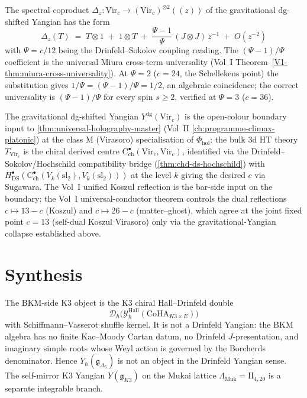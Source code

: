 \begin{remark}
\label{rem:thqg-gravitational-yangian-miura-coproduct}
The spectral coproduct
$\Delta_z\colon \mathrm{Vir}_c \to (\mathrm{Vir}_c)^{\otimes 2}((z))$
of the gravitational dg-shifted Yangian has the form
\[
\Delta_z(T) \;=\; T\otimes 1 \;+\; 1\otimes T \;+\;
\frac{\Psi-1}{\Psi}\,(J\otimes J)\,z^{-1} \;+\; O(z^{-2})
\]
with $\Psi = c/12$ being the Drinfeld--Sokolov coupling reading.
The $(\Psi-1)/\Psi$ coefficient is the universal Miura
cross-term universality (Vol~I
Theorem~\ref*{V1-thm:miura-cross-universality}). At
$\Psi=2$ ($c=24$, the Schellekens point) the substitution gives
$1/\Psi = (\Psi-1)/\Psi = 1/2$, an algebraic coincidence; the
correct universality is $(\Psi-1)/\Psi$ for every spin $s\ge 2$,
verified at $\Psi=3$ ($c=36$).
\end{remark}

\begin{remark}
\label{rem:thqg-gravitational-yangian-uhm}
The gravitational dg-shifted Yangian
$Y^{\mathrm{dg}}(\mathrm{Vir}_c)$ is the open-colour boundary
input to \cref{thm:universal-holography-master} (Vol~II
\cref{ch:programme-climax-platonic}) at the class M (Virasoro)
specialisation of $\Phi_{\mathrm{hol}}$: the bulk 3d HT theory
$T_{\mathrm{Vir}_c}$ is the chiral derived centre
$\mathrm{C}^\bullet_{\mathrm{ch}}(\mathrm{Vir}_c, \mathrm{Vir}_c)$,
identified via the Drinfeld--Sokolov/Hochschild compatibility bridge
(\cref{thm:chd-ds-hochschild}) with
$H^\bullet_{\mathrm{DS}}(\mathrm{C}^\bullet_{\mathrm{ch}}
(V_k(\mathrm{sl}_2), V_k(\mathrm{sl}_2)))$ at the level $k$ giving
the desired $c$ via Sugawara. The Vol~I unified Koszul reflection
is the bar-side input on the boundary; the Vol~I universal-conductor
theorem controls the dual reflections $c\mapsto 13-c$ (Koszul) and
$c\mapsto 26-c$ (matter--ghost), which agree at the joint fixed
point $c=13$ (self-dual Koszul Virasoro) only via the
gravitational-Yangian collapse established above.
\end{remark}

\section{Synthesis}
\label{sec:thqgy-supplement}

\begin{remark}
\label{rem:thqgy-hall-drinfeld-scope}
The BKM-side K3 object is the K3 chiral Hall--Drinfeld double
\[
 \mathcal D_\hbar\bigl(
 \mathcal Y^{\mathrm{Hall}}_\hbar(\mathrm{CoHA}_{K3\times E})
 \bigr)
\]
with Schiffmann--Vasserot shuffle kernel. It is not a Drinfeld
Yangian: the BKM algebra has no finite Kac--Moody Cartan datum, no
Drinfeld $J$-presentation, and imaginary simple roots whose Weyl
action is governed by the Borcherds denominator. Hence
$Y_\hbar(\mathfrak g_{\Delta_5})$ is not an object in the Drinfeld
Yangian sense. The self-mirror K3 Yangian
$Y(\mathfrak g_{K3})$ on the Mukai lattice
$\Lambda_{\mathrm{Muk}}=\mathrm{II}_{4,20}$ is a separate integrable
branch.
\end{remark}
